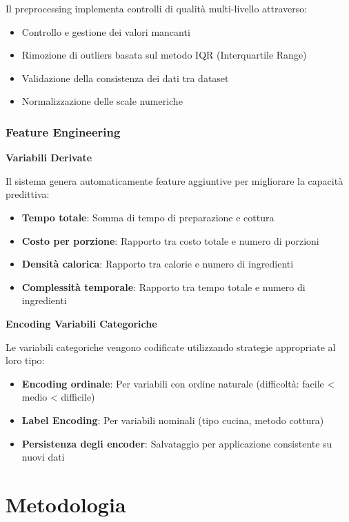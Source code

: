 \documentclass[12pt,a4paper]{article}
\begin{document}
Il preprocessing implementa controlli di qualità multi-livello attraverso:
\begin{itemize}
    \item Controllo e gestione dei valori mancanti
    \item Rimozione di outliers basata sul metodo IQR (Interquartile Range)
    \item Validazione della consistenza dei dati tra dataset
    \item Normalizzazione delle scale numeriche
\end{itemize}

\subsubsection{Feature Engineering}

\textbf{Variabili Derivate}

Il sistema genera automaticamente feature aggiuntive per migliorare la capacità predittiva:
\begin{itemize}
    \item \textbf{Tempo totale}: Somma di tempo di preparazione e cottura
    \item \textbf{Costo per porzione}: Rapporto tra costo totale e numero di porzioni
    \item \textbf{Densità calorica}: Rapporto tra calorie e numero di ingredienti
    \item \textbf{Complessità temporale}: Rapporto tra tempo totale e numero di ingredienti
\end{itemize}

\textbf{Encoding Variabili Categoriche}

Le variabili categoriche vengono codificate utilizzando strategie appropriate al loro tipo:
\begin{itemize}
    \item \textbf{Encoding ordinale}: Per variabili con ordine naturale (difficoltà: facile < medio < difficile)
    \item \textbf{Label Encoding}: Per variabili nominali (tipo cucina, metodo cottura)
    \item \textbf{Persistenza degli encoder}: Salvataggio per applicazione consistente su nuovi dati
\end{itemize}

\section{Metodologia}
\end{document}
